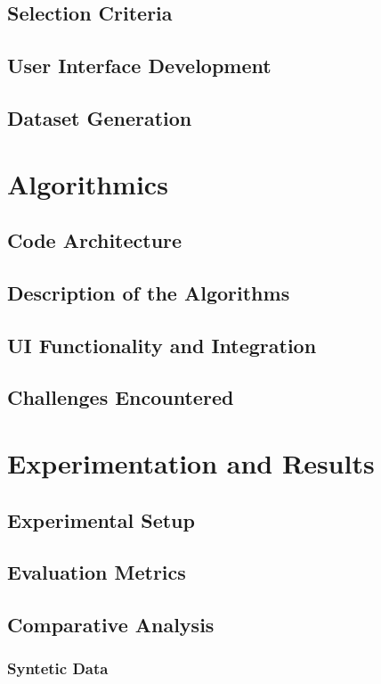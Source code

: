 \documentclass[a4paper,12pt]{article}
\begin{document}
\subsection{Selection Criteria}
\subsection{User Interface Development}
\subsection{Dataset Generation}

\section{Algorithmics}
\subsection{Code Architecture}
\subsection{Description of the Algorithms}
\subsection{UI Functionality and Integration}
\subsection{Challenges Encountered}

\section{Experimentation and Results}
\subsection{Experimental Setup}
\subsection{Evaluation Metrics}
\subsection{Comparative Analysis}
\subsubsection{Syntetic Data}
\end{document}
